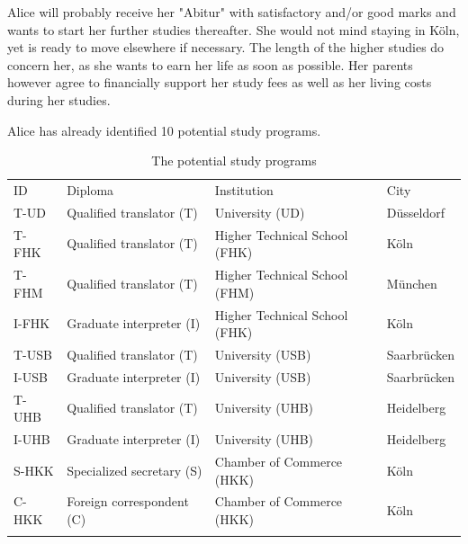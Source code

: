 Alice will probably receive her "Abitur" with satisfactory and/or good marks and  wants to start her further studies thereafter. She would not mind staying in Köln, yet is ready to move elsewhere if necessary. The length of the higher studies do concern her, as she wants to earn her life as soon as possible.  Her parents however agree to financially support her study fees as well as her living costs during her studies.

Alice has already identified 10 potential study programs.

\begin{table}[h]
\caption{The potential study programs}
\label{tab:12.1}       %
\begin{center}
    \begin{tabular}{l|l|l|l}
      \svhline\noalign{\smallskip}
      ID & Diploma & Institution & City\\
      \noalign{\smallskip}\hline\noalign{\smallskip}
      T-UD   & Qualified translator (T)  &   University (UD)               &  Düsseldorf\\
      T-FHK  & Qualified translator (T)  &   Higher Technical School (FHK) &  Köln\\
      T-FHM  & Qualified translator (T)  &   Higher Technical School (FHM) &  München\\
      I-FHK  & Graduate interpreter (I)  &   Higher Technical School (FHK) &  Köln\\
      T-USB  & Qualified translator (T)  &   University (USB)              &  Saarbrücken\\
      I-USB  & Graduate interpreter (I)  &   University (USB)              &  Saarbrücken\\
      T-UHB  & Qualified translator (T)  &   University (UHB)              &  Heidelberg\\
      I-UHB  & Graduate interpreter (I)  &   University (UHB)              &  Heidelberg\\
      S-HKK  & Specialized secretary (S) &   Chamber of Commerce (HKK)     &  Köln\\
      C-HKK  & Foreign correspondent (C) &   Chamber of Commerce (HKK)     &  Köln\\
      \noalign{\smallskip}\hline
    \end{tabular}
\end{center}
\end{table}


